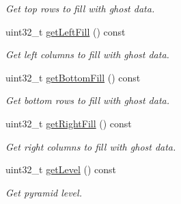 \begin{DoxyCompactItemize}
\begin{DoxyCompactList}\small\item\em Get top rows to fill with ghost data. \end{DoxyCompactList}\item 
uint32\+\_\+t \hyperlink{classfi_1_1HTGSViewRequestData_a08d848986e08b523280c8c8b69b6b49d}{get\+Left\+Fill} () const
\begin{DoxyCompactList}\small\item\em Get left columns to fill with ghost data. \end{DoxyCompactList}\item 
uint32\+\_\+t \hyperlink{classfi_1_1HTGSViewRequestData_a1024caaff4a946af5666bf2a36e77994}{get\+Bottom\+Fill} () const
\begin{DoxyCompactList}\small\item\em Get bottom rows to fill with ghost data. \end{DoxyCompactList}\item 
uint32\+\_\+t \hyperlink{classfi_1_1HTGSViewRequestData_a6561f54627c62eae81106ec6f1ae18a1}{get\+Right\+Fill} () const
\begin{DoxyCompactList}\small\item\em Get right columns to fill with ghost data. \end{DoxyCompactList}\item 
uint32\+\_\+t \hyperlink{classfi_1_1HTGSViewRequestData_a960534d61373c3f310f248b3ceec7cb4}{get\+Level} () const
\begin{DoxyCompactList}\small\item\em Get pyramid level. \end{DoxyCompactList}\end{DoxyCompactItemize}
